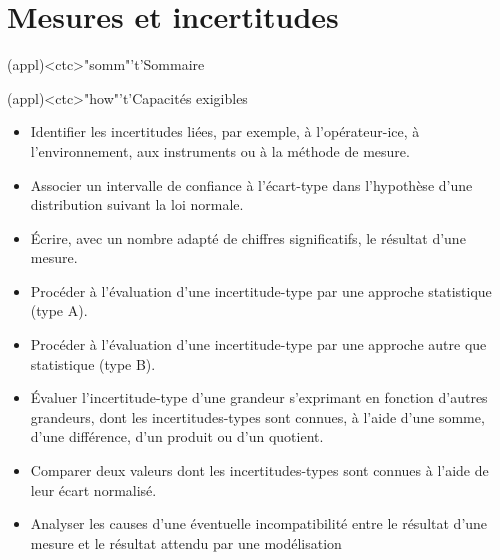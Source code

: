 \documentclass[../../main/main.tex]{subfiles}
\begin{document}
\setcounter{chapter}{1}


\chapter{Mesures et incertitudes}


\begin{tcn}(appl)<ctc>"somm"'t'{Sommaire}
	\let\item\olditem
	\vspace{-15pt}
	\minitoc
	\vspace{-25pt}
\end{tcn}

\begin{tcn}[sidebyside](appl)<ctc>"how"'t'{Capacités exigibles}
	\begin{itemize}[label=\rcheck]
		\item Identifier les incertitudes liées, par exemple, à l'opérateur-ice, à
		      l'environnement, aux instruments ou à la méthode de mesure.
		\item Associer un intervalle de confiance à l'écart-type dans l'hypothèse
		      d'une distribution suivant la loi normale.
		\item Écrire, avec un nombre adapté de chiffres significatifs, le résultat
		      d’une mesure.
		\item Procéder à l'évaluation d'une incertitude-type par une approche
		      statistique (type A).
	\end{itemize}
	\tcblower
	\begin{itemize}[label=\rcheck]
		\item Procéder à l'évaluation d'une incertitude-type par une approche
		      autre que statistique (type B).
		\item Évaluer l'incertitude-type d'une grandeur s'exprimant en fonction
		      d'autres grandeurs, dont les incertitudes-types sont connues, à
		      l'aide d'une somme, d'une différence, d'un produit ou d'un quotient.
		\item Comparer deux valeurs dont les incertitudes-types sont connues à
		      l'aide de leur écart normalisé.
		\item Analyser les causes d’une éventuelle incompatibilité entre le
		      résultat d’une mesure et le résultat attendu par une modélisation
	\end{itemize}
\end{tcn}
\end{document}
